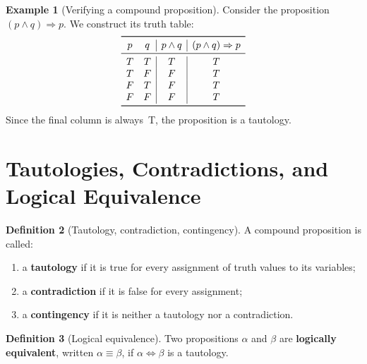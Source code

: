 \documentclass[12pt,a4paper,openany]{book}
\theoremstyle{definition}
\newtheorem{definition}{Definition}[chapter]
\newtheorem{example}[definition]{Example}
\theoremstyle{plain}
\theoremstyle{remark}
\begin{document}
\begin{example}[Verifying a compound proposition]
\label{ex:truth-table-compound}
Consider the proposition $(p \land q) \Rightarrow p$. We construct its truth table:
\[
\begin{array}{cc|c|c}
\toprule
p & q & p \land q & (p \land q) \Rightarrow p \\
\midrule
T & T & T & T \\
T & F & F & T \\
F & T & F & T \\
F & F & F & T \\
\bottomrule
\end{array}
\]
Since the final column is always~T, the proposition is a tautology.
\end{example}

\section{Tautologies, Contradictions, and Logical Equivalence}
\label{sec:tautologies}

\begin{definition}[Tautology, contradiction, contingency]
\label{def:tautology}
A compound proposition is called:
\begin{enumerate}[nosep]
  \item a \textbf{tautology} if it is true for every assignment of
        truth values to its variables;
  \item a \textbf{contradiction} if it is false for every
        assignment;
  \item a \textbf{contingency} if it is neither a tautology nor a contradiction.
\end{enumerate}
\end{definition}

\begin{definition}[Logical equivalence]
\label{def:logical-equivalence}
Two propositions $\alpha$ and $\beta$ are \textbf{logically equivalent}, written
$\alpha \equiv \beta$, if $\alpha \Leftrightarrow \beta$ is a tautology.
\end{definition}
\end{document}
